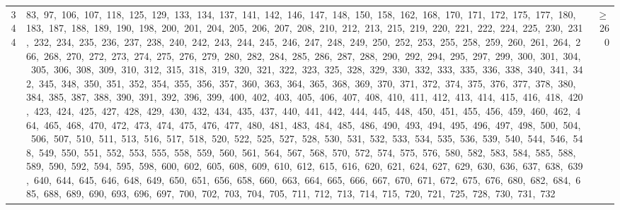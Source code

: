 \begin{longtable}{c|p{}|r}
344 & 83,\ 97,\ 106,\ 107,\ 118,\ 125,\ 129,\ 133,\ 134,\ 137,\ 141,\ 142,\ 146,\ 147,\ 148,\ 150,\ 158,\ 162,\ 168,\ 170,\ 171,\ 172,\ 175,\ 177,\ 180,\ 183,\ 187,\ 188,\ 189,\ 190,\ 198,\ 200,\ 201,\ 204,\ 205,\ 206,\ 207,\ 208,\ 210,\ 212,\ 213,\ 215,\ 219,\ 220,\ 221,\ 222,\ 224,\ 225,\ 230,\ 231,\ 232,\ 234,\ 235,\ 236,\ 237,\ 238,\ 240,\ 242,\ 243,\ 244,\ 245,\ 246,\ 247,\ 248,\ 249,\ 250,\ 252,\ 253,\ 255,\ 258,\ 259,\ 260,\ 261,\ 264,\ 266,\ 268,\ 270,\ 272,\ 273,\ 274,\ 275,\ 276,\ 279,\ 280,\ 282,\ 284,\ 285,\ 286,\ 287,\ 288,\ 290,\ 292,\ 294,\ 295,\ 297,\ 299,\ 300,\ 301,\ 304,\ 305,\ 306,\ 308,\ 309,\ 310,\ 312,\ 315,\ 318,\ 319,\ 320,\ 321,\ 322,\ 323,\ 325,\ 328,\ 329,\ 330,\ 332,\ 333,\ 335,\ 336,\ 338,\ 340,\ 341,\ 342,\ 345,\ 348,\ 350,\ 351,\ 352,\ 354,\ 355,\ 356,\ 357,\ 360,\ 363,\ 364,\ 365,\ 368,\ 369,\ 370,\ 371,\ 372,\ 374,\ 375,\ 376,\ 377,\ 378,\ 380,\ 384,\ 385,\ 387,\ 388,\ 390,\ 391,\ 392,\ 396,\ 399,\ 400,\ 402,\ 403,\ 405,\ 406,\ 407,\ 408,\ 410,\ 411,\ 412,\ 413,\ 414,\ 415,\ 416,\ 418,\ 420,\ 423,\ 424,\ 425,\ 427,\ 428,\ 429,\ 430,\ 432,\ 434,\ 435,\ 437,\ 440,\ 441,\ 442,\ 444,\ 445,\ 448,\ 450,\ 451,\ 455,\ 456,\ 459,\ 460,\ 462,\ 464,\ 465,\ 468,\ 470,\ 472,\ 473,\ 474,\ 475,\ 476,\ 477,\ 480,\ 481,\ 483,\ 484,\ 485,\ 486,\ 490,\ 493,\ 494,\ 495,\ 496,\ 497,\ 498,\ 500,\ 504,\ 506,\ 507,\ 510,\ 511,\ 513,\ 516,\ 517,\ 518,\ 520,\ 522,\ 525,\ 527,\ 528,\ 530,\ 531,\ 532,\ 533,\ 534,\ 535,\ 536,\ 539,\ 540,\ 544,\ 546,\ 548,\ 549,\ 550,\ 551,\ 552,\ 553,\ 555,\ 558,\ 559,\ 560,\ 561,\ 564,\ 567,\ 568,\ 570,\ 572,\ 574,\ 575,\ 576,\ 580,\ 582,\ 583,\ 584,\ 585,\ 588,\ 589,\ 590,\ 592,\ 594,\ 595,\ 598,\ 600,\ 602,\ 605,\ 608,\ 609,\ 610,\ 612,\ 615,\ 616,\ 620,\ 621,\ 624,\ 627,\ 629,\ 630,\ 636,\ 637,\ 638,\ 639,\ 640,\ 644,\ 645,\ 646,\ 648,\ 649,\ 650,\ 651,\ 656,\ 658,\ 660,\ 663,\ 664,\ 665,\ 666,\ 667,\ 670,\ 671,\ 672,\ 675,\ 676,\ 680,\ 682,\ 684,\ 685,\ 688,\ 689,\ 690,\ 693,\ 696,\ 697,\ 700,\ 702,\ 703,\ 704,\ 705,\ 711,\ 712,\ 713,\ 714,\ 715,\ 720,\ 721,\ 725,\ 728,\ 730,\ 731,\ 732 & $\ge$ 260 \\

\end{longtable}
